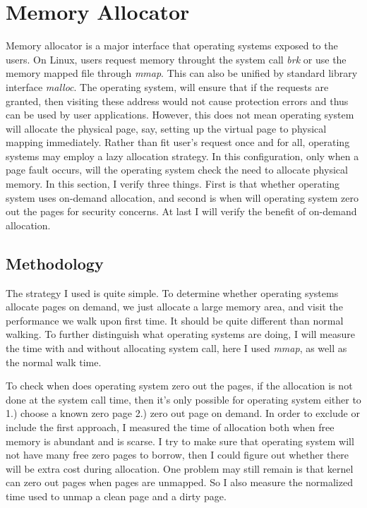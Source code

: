 \section{Memory Allocator}
	\label{sec:alloc}
Memory allocator is a major interface that operating systems exposed to the
users. On Linux, users request memory throught the system call \emph{brk} or
use the memory mapped file through \emph{mmap}. This can also be unified by
standard library interface \emph{malloc}.  The operating system, will ensure
that if the requests are granted, then visiting these address would not cause
protection errors and thus can be used by user applications. However, this does
not mean operating system will allocate the physical page, say, setting up the
virtual page to physical mapping immediately.  Rather than fit user's request
once and for all, operating systems may employ a lazy allocation strategy. In
this configuration, only when a page fault occurs, will the operating system
check the need to allocate physical memory. In this section, I verify three things.
First is that whether operating system uses on-demand allocation, and second
is when will operating system zero out the pages for security concerns. At last
I will verify the benefit of on-demand allocation.

\subsection{Methodology}
The strategy I used is quite simple. To determine whether operating systems
allocate pages on demand, we just allocate a large memory area, and visit the
performance we walk upon first time. It should be quite different than normal
walking. To further distinguish what operating systems are doing, I will measure
the time with and without allocating system call, here I used \emph{mmap}, as
well as the normal walk time.

To check when does operating system zero out the pages, if the allocation is
not done at the system call time, then it's only possible for operating system
either to 1.) choose a known zero page 2.) zero out page on demand. In order
to exclude or include the first approach, I measured the time of allocation
both when free memory is abundant and is scarse. I try to make sure that 
operating system will not have many free zero pages to borrow, then I could
figure out whether there will be extra cost during allocation. One problem may
still remain is that kernel can zero out pages when pages are unmapped. So I
also measure the normalized time used to unmap a clean page and a dirty page.

